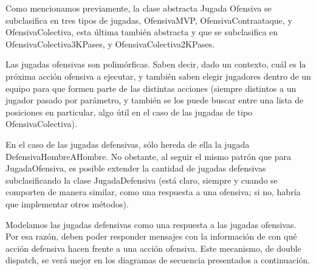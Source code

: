 Como mencionamos previamente, la clase abstracta Jugada Ofensiva se subclasifica en tres tipos de jugadas, OfensivaMVP, OfensivaContraataque, y OfensivaColectiva, esta última también abstracta y que se subclasifica en OfensivaColectiva3KPases, y OfensivaColectiva2KPases.

Las jugadas ofensivas son polimórficas. Saben decir, dado un contexto, cuál es la próxima acción ofensiva a ejecutar, y también saben elegir jugadores dentro de un equipo para que formen parte de las distintas acciones (siempre distintos a un jugador pasado por parámetro, y también se los puede buscar entre una lista de posiciones en particular, algo útil en el caso de las jugadas de tipo OfensivaColectiva).

En el caso de las jugadas defensivas, sólo hereda de ella la jugada DefensivaHombreAHombre. No obstante, al seguir el mismo patrón que para JugadaOfensiva, es posible extender la cantidad de jugadas defensivas subclasificando la clase JugadaDefensiva (está claro, siempre y cuando se comporten de manera similar, como una respuesta a una ofensiva; si no, habría que implementar otros métodos).

Modelamos las jugadas defensivas como una respuesta a las jugadas ofensivas. Por esa razón, deben poder responder mensajes con la información de con qué acción defensiva hacen frente a una acción ofensiva. Este mecanismo, de double dispatch, se verá mejor en los diagramas de secuencia presentados a continuación.

